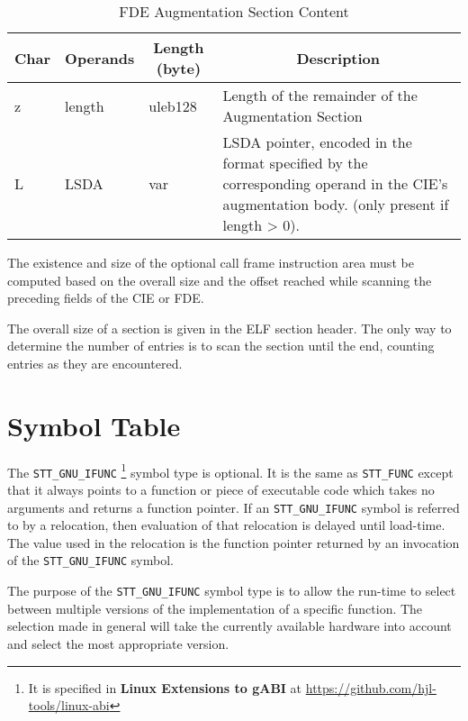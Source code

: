 \begin{table}[H]
\Hrule
\caption{FDE Augmentation Section Content}
\label{format-fdeaug}
\begin{center}
\begin{tabular}{l|p{6em}|l|p{16em}}
  \multicolumn{1}{c}{Char}
         & \multicolumn{1}{c}{Operands}
         & \multicolumn{1}{c}{Length (byte)}
         & \multicolumn{1}{c}{Description} \\ \hline
  z & length & uleb128 & Length of the remainder of the
                                        Augmentation Section \\
  L & LSDA & var & LSDA pointer, encoded in the
                   format specified by the
                   corresponding operand in the CIE's
                   augmentation body. (only present if length > 0). \\
\hline
    \end{tabular}
  \end{center}
\Hrule
\end{table}
The existence and size of the optional call frame instruction area must
be computed
based on the overall size and the offset reached while scanning the
preceding fields of the CIE or FDE.

The overall size of a  section is given in the ELF section
header.  The only way to determine the number of entries is to scan
the section until the end, counting entries as they are encountered.

\section{Symbol Table}

The \texttt{STT_GNU_IFUNC}
\footnote{It is specified in {\bf Linux Extensions to gABI}
at \url{https://github.com/hjl-tools/linux-abi}}
symbol type is optional. It is the same as
\texttt{STT_FUNC} except that it always points to a function or piece of
executable code which takes no arguments and returns a function pointer.
If an \texttt{STT_GNU_IFUNC} symbol is referred to by a relocation, then
evaluation of that relocation is delayed until load-time.  The value
used in the relocation is the function pointer returned by an invocation
of the \texttt{STT_GNU_IFUNC} symbol.
 
The purpose of the \texttt{STT_GNU_IFUNC} symbol type is to allow the
run-time to select between multiple versions of the implementation of
a specific function.  The selection made in general will take the
currently available hardware into account and select the most
appropriate version.

